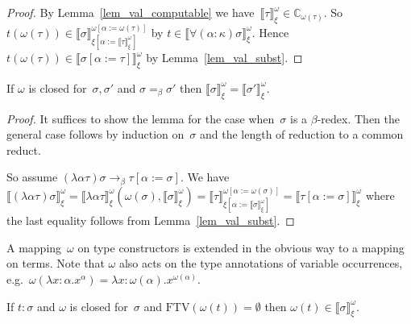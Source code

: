 \documentclass[a4paper,UKenglish,cleveref,autoref,numberwithinsect]{lipics-v2019}
\theoremstyle{definition}
\newcommand{\subst}[2]{#1:=#2}
\newcommand{\FTV}{\mathrm{FTV}}
\newcommand{\Cb}{\mathbb{C}}
\newcommand{\val}[3]{\ensuremath{\llbracket#1\rrbracket_{#2}^{#3}}}
\begin{document}
\begin{proof}
  By Lemma~\ref{lem_val_computable} we have~$\val{\tau}{\xi}{\omega}
  \in \Cb_{\omega(\tau)}$. So $t (\omega(\tau)) \in
  \val{\sigma}{\xi[\subst{\alpha}{\val{\tau}{\xi}{\omega}}]}{\omega[\subst{\alpha}{\omega(\tau)}]}$
  by $t \in \val{\forall(\alpha:\kappa)\sigma}{\xi}{\omega}$. Hence
  $t (\omega(\tau)) \in
  \val{\sigma[\subst{\alpha}{\tau}]}{\xi}{\omega}$ by
  Lemma~\ref{lem_val_subst}.
\end{proof}

\begin{lemma}\label{lem_beta_val}
  If $\omega$ is closed for~$\sigma,\sigma'$ and $\sigma =_\beta
  \sigma'$ then $\val{\sigma}{\xi}{\omega} =
  \val{\sigma'}{\xi}{\omega}$.
\end{lemma}

\begin{proof}
  It suffices to show the lemma for the case when~$\sigma$ is a
  $\beta$-redex. Then the general case follows by induction
  on~$\sigma$ and the length of reduction to a common reduct.

  So assume $(\lambda\alpha\tau)\sigma \to_\beta
  \tau[\subst{\alpha}{\sigma}]$. We have
  $\val{(\lambda\alpha\tau)\sigma}{\xi}{\omega} =
  \val{\lambda\alpha\tau}{\xi}{\omega}(\omega(\sigma),
  \val{\sigma}{\xi}{\omega}) =
  \val{\tau}{\xi[\subst{\alpha}{\val{\sigma}{\xi}{\omega}}]}{\omega[\subst{\alpha}{\omega(\sigma)}]}
  = \val{\tau[\subst{\alpha}{\sigma}]}{\xi}{\omega}$ where the last
  equality follows from Lemma~\ref{lem_val_subst}.
\end{proof}

A mapping~$\omega$ on type constructors is extended in the obvious way
to a mapping on terms. Note that $\omega$ also acts on the type
annotations of variable occurrences, e.g.~$\omega(\lambda x : \alpha
. x^\alpha) = \lambda x : \omega(\alpha) . x^{\omega(\alpha)}$.

\begin{lemma}\label{lem_typable_computable}
  If $t : \sigma$ and $\omega$ is closed for~$\sigma$ and
  $\FTV(\omega(t)) = \emptyset$ then $\omega(t) \in
  \val{\sigma}{\xi}{\omega}$.
\end{lemma}
\end{document}

